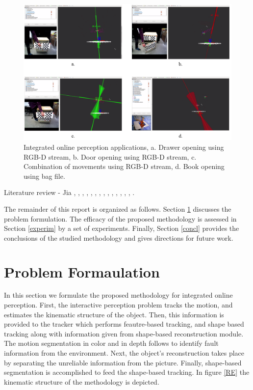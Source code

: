\documentclass[letterpaper, 10 pt, conference]{ieeeconf}
\begin{document}
\begin{figure}[!h]
        \includegraphics[width=.5\textwidth]{figures/Cover.png}
        \centering
        \caption{Integrated online perception applications, a. Drawer opening using RGB-D stream, b. Door opening using RGB-D stream, c. Combination of movements using RGB-D stream, d. Book opening using bag file.}
        \label{cover}
\end{figure}

\par Literature review - Jia
\cite{wuthrich2013probabilistic}, \cite{ochs2014segmentation}, \cite{felzenszwalb2004efficient}, \cite{papon2013voxel}, \cite{chien2002efficient}, \cite{kenney2009interactive}, \cite{stuckler2013efficient}, \cite{ochs2014segmentation}, \cite{martin2014online}, \cite{ross2008unsupervised}, \cite{urgen2009learning}, \cite{sturm2010vision}, \cite{huang2012occlusion}, \cite{katz2014interactive}, \cite{katz2013interactive}.

The remainder of this report is organized as follows. Section \ref{pf} discusses the problem formulation. 
The efficacy of the proposed methodology is assessed in Section \ref{experim} by a set of experiments. Finally, Section \ref{concl} provides the conclusions of the studied methodology and gives directions for future work.  

\section{Problem Formaulation}\label{pf}
In this section we formulate the proposed methodology for integrated online perception. First, the interactive perception problem tracks the motion, and estimates the kinematic structure of the object. Then, this information is provided to the tracker which performs feautre-based tracking, and shape based tracking along with information given from shape-based reconstruction module. The motion segmentation in color and in depth follows to identify fault information from the environment. Next, the object's reconstruction takes place by separating the unreliable information from the picture. Finally, shape-based segmentation is accomplished to feed the shape-based tracking. In figure \ref{RE} the kinematic structure of the methodology is depicted. 
\end{document}
